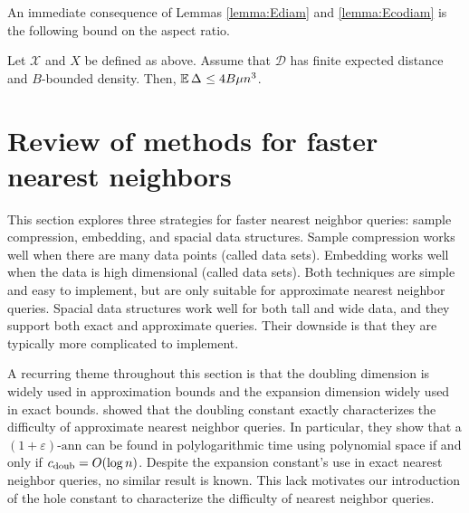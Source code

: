 \documentclass[thesis.tex]{subfiles}
\newcommand{\set}[1]{\mathcal {#1}}
\newcommand{\distribution}[1]{\mathcal {#1}}
\newcommand{\aspect}[1]{\Delta_{#1}}
\newcommand{\cdoub}{c_\textnormal{doub}}
\newcommand{\eann}{(1+\varepsilon)\text{-ann}}
\begin{document}
\noindent
An immediate consequence of Lemmas \ref{lemma:Ediam} and \ref{lemma:Ecodiam} is the following bound on the aspect ratio.

\begin{lemma}
    \label{lemma:Easpect}
    Let $\set X$ and $X$ be defined as above.
    Assume that $\distribution D$ has finite expected distance and $B$-bounded density.
    Then, $\E\aspect{} \le4B\mu n^3$.
\end{lemma}


\section{Review of methods for faster nearest neighbors}
\label{sec:review}

This section explores three strategies for faster nearest neighbor queries:
sample compression, embedding, and spacial data structures.
Sample compression works well when there are many data points
(called  data sets).
Embedding works well when the data is high dimensional
(called  data sets).
Both techniques are simple and easy to implement, 
but are only suitable for approximate nearest neighbor queries.
Spacial data structures work well for both tall and wide data,
and they support both exact and approximate queries.
Their downside is that they are typically more complicated to implement.

A recurring theme throughout this section is that the doubling dimension is widely used in approximation bounds and the expansion dimension widely used in exact bounds.
\cite{krauthgamer2005black} showed that the doubling constant exactly characterizes the difficulty of approximate nearest neighbor queries.
In particular, they show that a $\eann$ can be found in polylogarithmic time using polynomial space if and only if $\cdoub = O(\log n)$.
Despite the expansion constant's use in exact nearest neighbor queries,
no similar result is known.
This lack motivates our introduction of the hole constant to characterize the difficulty of nearest neighbor queries.
\end{document}
